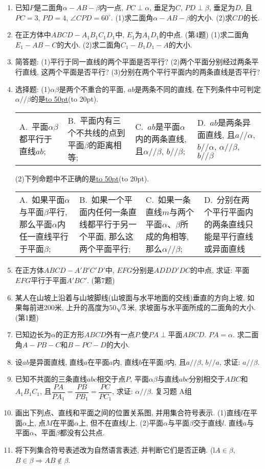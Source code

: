\documentclass[10pt,a4paper]{article}
\newcommand{\blank}[1]{\underline{\hbox to #1pt{}}}
\newcommand{\bracket}[1]{(\hbox to #1pt{})}
\newcommand{\fourch}[4]{\par\begin{tabular}{p{.23\textwidth}p{.23\textwidth}p{.23\textwidth}p{.23\textwidth}}
A.~#1 &B.~#2& C.~#3& D.~#4
\end{tabular}}
\begin{document}
\begin{enumerate}[1.]
\item 已知$P$是二面角$\alpha -AB-\beta$内一点, $PC\perp \alpha$, 垂足为$C$, $PD\perp \beta$, 垂足为$D$, 且$PC=3$, $PD=4$, $\angle CPD=60^\circ$.
(1)求二面角$\alpha -AB-\beta$的大小.
(2)求$CD$的长.
\item 在正方体中$ABCD-A_1B_1C_1D_1$中, $E_1$为$A_1D_1$的中点.
(第4题)
(1)求二面角$E_1-AB-C$的大小.
(2)求二面角$C_1-B_1D_1-A$的大小.
\item 简答题:
(1)平行于同一直线的两个平面是否平行?
(2)两个平面分别经过两条平行直线, 这两个平面是否平行?
(3)分别在两个平行平面内的两条直线是否平行?
\item 选择题:
(1)$\alpha \beta$是两个不重合的平面, $ab$是两条不同的直线, 在下列条件中可判定$\alpha //\beta$的是\blank{50}\bracket{20}.
\fourch{平面$\alpha \beta$都平行于直线$ab$;}{平面内有三个不共线的点到平面$\beta$的距离相等;}{$ab$是平面$\alpha$内的两条直线, 且$\alpha //\beta$, $b//\beta$;}{$ab$是两条异面直线, 且$a//\alpha$, $b//\alpha$, $\alpha //\beta$, $b//\beta$}
(2)下列命题中不正确的是\blank{50}\bracket{20}.
\fourch{如果平面$\alpha$与平面$\beta$平行, 那么平面$\alpha$内任一直线平行于平面$\beta$;}{如果一个平面内任何一条直线都平行于另一个平面, 那么这两个平面平行;}{如果一条直线$m$与两个平面$\alpha$、$\beta$所成的角相等, 那么$\alpha //\beta$;}{分别在两个平行平面内的两条直线只能是平行直线或异面直线}
\item 在正方体$ABCD-A'B'C'D'$中, $EFG$分别是$ADDD'DC$的中点, 求证: 平面$EFG$平行于平面$A'BC'$.
(第7题)
\item 某人在山坡上沿着与山坡脚线(山坡面与水平地面的交线)垂直的方向上坡, 如果每前进200米, 上升的高度为$50\sqrt 3$米, 求坡面与水平面所成的二面角的大小.
(第1题)
\item 已知边长为$\alpha$的正方形$ABCD$外有一点$P$.使$PA\perp$平面$ABCD$. $PA=\alpha$. 求二面角$A-PB-C$和$B-PC-D$的大小.
\item 设$ab$是异面直线, 直线$a$在平面$a$内, 直线$b$在平面$\beta$内, 且$a//\beta$, $b//a$, 求证: $a//\beta$.
\item 已知不共面的三条直线$abc$相交于点$P$, 平面$\alpha \beta$与直线$abc$分别相交于$ABC$和$A_1B_1C_1$, 且$\dfrac{PA}{P{A_1}}=\dfrac{PB}{P{B_1}}=\dfrac{PC}{P{C_1}}$, 求证: $\alpha //\beta$.
复习题
A组
\item 画出下列点、直线和平面之间的位置关系图, 并用集合符号表示.
(1)直线$l$在平面$\alpha$上, 点$M$在平面$\alpha$上, 但不在直线$l$上.
(2)平面$\alpha$与平面$\beta$交于直线$l$. 直线$a$与平面$\alpha$、平面$\beta$都没有公共点.
\item 将下列集合符号表述改为自然语言表述, 并判断它们是否正确.
(l$A\in \beta$, $B\in \beta \Rightarrow AB\not\in \beta$.

\end{enumerate}
\end{document}

